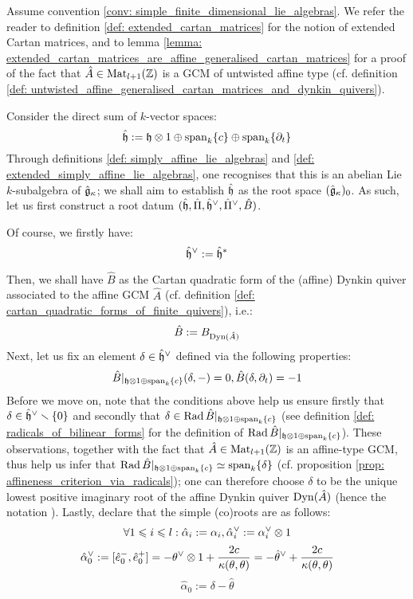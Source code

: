         \begin{convention} \label{conv: root_data_of_extended_cartan_matrices}
            Assume convention \ref{conv: simple_finite_dimensional_lie_algebras}. We refer the reader to definition \ref{def: extended_cartan_matrices} for the notion of extended Cartan matrices, and to lemma \ref{lemma: extended_cartan_matrices_are_affine_generalised_cartan_matrices} for a proof of the fact that $\hat{A} \in \mathrm{Mat}_{l + 1}(\mathbb{Z})$ is a GCM of untwisted affine type (cf. definition \ref{def: untwisted_affine_generalised_cartan_matrices_and_dynkin_quivers}).
        
            Consider the direct sum of $k$-vector spaces:
                $$\hat{\h} := \h \tensor 1 \oplus \span_k \{c\} \oplus \span_k \{\del_t\}$$
            Through definitions \ref{def: simply_affine_lie_algebras} and \ref{def: extended_simply_affine_lie_algebras}, one recognises that this is an abelian Lie $k$-subalgebra of $\hat{\mathfrak{g}}_{\kappa}$; we shall aim to establish $\hat{\mathfrak{h}}$ as the root space $(\hat{\mathfrak{g}}_{\kappa})_0$. As such, let us first construct a root datum $(\hat{\mathfrak{h}}, \hat{\Pi}, \hat{\mathfrak{h}}^{\vee}, \hat{\Pi}^{\vee}, \hat{B})$.
            
            Of course, we firstly have:
                $$\hat{\mathfrak{h}}^{\vee} := \hat{\mathfrak{h}}^*$$
                
            Then, we shall have $\hat{B}$ as the Cartan quadratic form of the (affine) Dynkin quiver associated to the affine GCM $\hat{A}$ (cf. definition \ref{def: cartan_quadratic_forms_of_finite_quivers}), i.e.:
                $$\hat{B} := B_{\mathrm{Dyn}(\hat{A})}$$ 
            Next, let us fix an element $\delta \in \hat{\mathfrak{h}}^{\vee}$ defined via the following properties:
                $$\hat{B}|_{\h \tensor 1 \oplus \span_k \{c\}}(\delta, -) = 0, \hat{B}(\delta, \del_t) = -1$$
            Before we move on, note that the conditions above help us ensure firstly that $\delta \in \hat{\mathfrak{h}}^{\vee} \smallsetminus \{0\}$ and secondly that $\delta \in \Rad \hat{B}|_{\h \tensor 1 \oplus \span_k \{c\}}$ (see definition \ref{def: radicals_of_bilinear_forms} for the definition of $\Rad \hat{B}|_{\h \tensor 1 \oplus \span_k \{c\}}$). These observations, together with the fact that $\hat{A} \in \mathrm{Mat}_{l + 1}(\mathbb{Z})$ is an affine-type GCM, thus help us infer that $\Rad \hat{B}|_{\h \tensor 1 \oplus \span_k \{c\}} \cong \span_k \{\delta\}$ (cf. proposition \ref{prop: affineness_criterion_via_radicals}); one can therefore choose $\delta$ to be the unique lowest positive imaginary root of the affine Dynkin quiver $\mathrm{Dyn}(\hat{A})$ (hence the notation \say{$\delta$}). Lastly, declare that the simple (co)roots are as follows:
                $$\forall 1 \leq i \leq l: \hat{\alpha}_i := \alpha_i, \hat{\alpha}_i^{\vee} := \alpha_i^{\vee} \tensor 1$$
                $$\hat{\alpha}_0^{\vee} := [\hat{e}_0^-, \hat{e}_0^+] = -\theta^{\vee} \tensor 1 + \frac{2c}{\kappa(\theta, \theta)} = -\hat{\theta}^{\vee} + \frac{2c}{\kappa(\theta, \theta)}$$
                $$\hat{\alpha}_0 := \delta - \hat{\theta}$$
        \end{convention}
    
